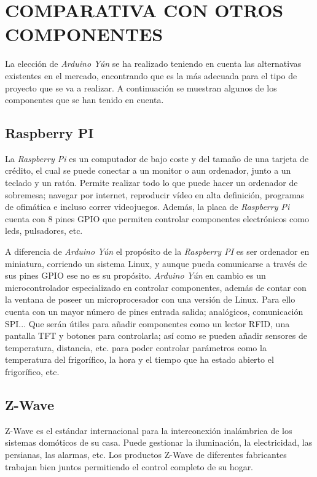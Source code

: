 \section{COMPARATIVA CON OTROS COMPONENTES}

La elección de \emph{Arduino Yún} se ha realizado teniendo en cuenta las alternativas existentes en el mercado, encontrando que es la más adecuada para el tipo de proyecto que se va a realizar. A continuación se muestran algunos de los componentes que se han tenido en cuenta.

\subsection{Raspberry PI}


La \emph{Raspberry Pi} es un computador de bajo coste y del tamaño de una tarjeta de crédito, el cual se puede conectar a un monitor o aun ordenador, junto a un teclado y un ratón. Permite realizar todo lo que puede hacer un ordenador de sobremesa; navegar por internet, reproducir vídeo en alta definición, programas de ofimática e incluso correr videojuegos. Además, la placa de \emph{Raspberry Pi} cuenta con 8 pines GPIO que permiten controlar componentes electrónicos como leds, pulsadores, etc. 

A diferencia de \emph{Arduino Yún} el propósito de la \emph{Raspberry PI} es ser ordenador en miniatura, corriendo un sistema Linux, y aunque pueda comunicarse a través de sus pines GPIO ese no es su propósito. \emph{Arduino Yún} en cambio es un microcontrolador especializado en controlar componentes, además de contar con la ventana de poseer un microprocesador con una versión de Linux. Para ello cuenta con un mayor número de pines entrada salida; analógicos, comunicación SPI... Que serán útiles para añadir componentes como un lector RFID, una pantalla TFT y botones para controlarla; así como se pueden añadir sensores de temperatura, distancia, etc. para poder controlar parámetros como la temperatura del frigorífico, la hora y el tiempo que ha estado abierto el frigorífico, etc.

\subsection{Z-Wave}

Z-Wave es el estándar internacional para la interconexión inalámbrica de los sistemas domóticos de su casa. Puede gestionar  la iluminación, la electricidad, las persianas, las alarmas, etc. Los productos Z-Wave de diferentes fabricantes trabajan bien juntos permitiendo el control completo de su hogar.

